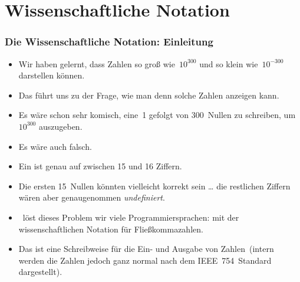 \documentclass[aspectratio=169,mathserif,notheorems]{beamer}%
\begin{document}
\section{Wissenschaftliche Notation}%
%
\begin{frame}%
\frametitle{Die Wissenschaftliche Notation: Einleitung}%
\begin{itemize}%
\item Wir haben gelernt, dass  Zahlen so groß wie~$10^{300}$ und so klein wie~$10^{-300}$ darstellen können.%
\item<2-> Das führt uns zu der Frage, wie man denn solche Zahlen anzeigen kann.%
\item<3-> Es wäre schon sehr komisch, eine~1 gefolgt von 300~Nullen zu schreiben, um~$10^{300}$ auszugeben.%
\item<4-> Es wäre auch falsch.%
\item<5-> Ein  ist genau auf zwischen 15 und 16 Ziffern.%
\item<6-> Die ersten 15~Nullen könnten vielleicht korrekt sein {\dots} die restlichen Ziffern wären aber genaugenommen \emph{undefiniert}.
 \item<7-> \python\ löst dieses Problem wir viele Programmiersprachen: mit der wissenschaftlichen Notation für Fließkommazahlen.%
 \item<8-> Das ist eine Schreibweise für die Ein- und Ausgabe von Zahlen~(intern werden die Zahlen jedoch ganz normal nach dem IEEE~754~Standard dargestellt).%
\end{itemize}%
\end{frame}%
%
\end{document}
